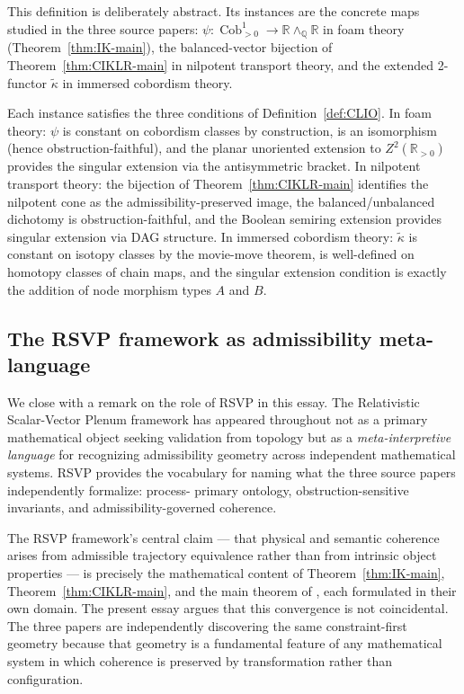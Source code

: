 \documentclass[12pt, a4paper]{article}
\theoremstyle{plain}
\theoremstyle{definition}
\theoremstyle{correspondence}
\DeclareMathOperator{\Cob}{Cob}
\newcommand{\RR}{\mathbb{R}}
\newcommand{\QQ}{\mathbb{Q}}
\newcommand{\wedgeQ}{\wedge_{\QQ}}
\begin{document}
This definition is deliberately abstract. Its instances are the concrete maps studied
in the three source papers: $\psi : \Cob^1_{>0} \to \RR \wedgeQ \RR$ in foam theory
(Theorem~\ref{thm:IK-main}), the balanced-vector bijection of
Theorem~\ref{thm:CIKLR-main} in nilpotent transport theory, and the extended 2-functor
$\tilde\kappa$ in immersed cobordism theory.

Each instance satisfies the three conditions of Definition~\ref{def:CLIO}. In foam
theory: $\psi$ is constant on cobordism classes by construction, is an isomorphism
(hence obstruction-faithful), and the planar unoriented extension to $Z^2(\RR_{>0})$
provides the singular extension via the antisymmetric bracket. In nilpotent transport
theory: the bijection of Theorem~\ref{thm:CIKLR-main} identifies the nilpotent cone
as the admissibility-preserved image, the balanced/unbalanced dichotomy is
obstruction-faithful, and the Boolean semiring extension provides singular extension
via DAG structure. In immersed cobordism theory: $\tilde\kappa$ is constant on isotopy
classes by the movie-move theorem, is well-defined on homotopy classes of chain maps,
and the singular extension condition is exactly the addition of node morphism types
$A$ and $B$.

\subsection{The RSVP framework as admissibility meta-language}

We close with a remark on the role of RSVP in this essay. The Relativistic Scalar-Vector
Plenum framework has appeared throughout not as a primary mathematical object seeking
validation from topology but as a \emph{meta-interpretive language} for recognizing
admissibility geometry across independent mathematical systems. RSVP provides the
vocabulary for naming what the three source papers independently formalize: process-
primary ontology, obstruction-sensitive invariants, and admissibility-governed coherence.

The RSVP framework's central claim --- that physical and semantic coherence arises from
admissible trajectory equivalence rather than from intrinsic object properties --- is
precisely the mathematical content of Theorem~\ref{thm:IK-main}, Theorem~\ref{thm:CIKLR-main},
and the main theorem of \cite{CCKK25}, each formulated in their own domain. The present
essay argues that this convergence is not coincidental. The three papers are
independently discovering the same constraint-first geometry because that geometry is a
fundamental feature of any mathematical system in which coherence is preserved by
transformation rather than configuration.
\end{document}

